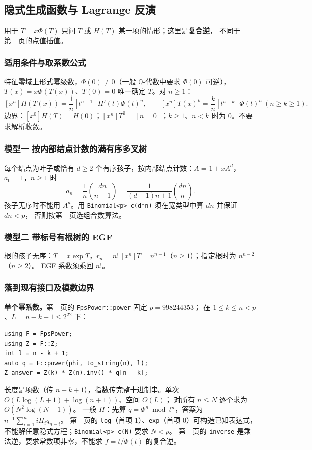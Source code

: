\subsection{隐式生成函数与 Lagrange 反演}\label{knowledge-lagrange-inversion}
用于 $T=x\Phi(T)$ 只问 $T$ 或 $H(T)$ 某一项的情形；这里是\textbf{复合逆}，
不同于第~\pageref{compact-Lagrange}~页的点值插值。

\subsubsection{适用条件与取系数公式}
特征零域上形式幂级数，$\Phi(0)\ne0$（一般 $\mathbb Q$-代数中要求 $\Phi(0)$ 可逆），
$T(x)=x\Phi(T(x))$、$T(0)=0$ 唯一确定 $T$。对 $n\ge1$：
\[
\boxed{[x^n]H(T(x))=\frac1n[t^{n-1}]H'(t)\Phi(t)^n,}\qquad
\boxed{[x^n]T(x)^k=\frac{k}{n}[t^{n-k}]\Phi(t)^n\ (n\ge k\ge1).}
\]
边界：$[x^0]H(T)=H(0)$；$[x^n]T^0=[n=0]$；$k\ge1$、$n<k$ 时为 0。不要求解析收敛。

\subsubsection{模型一 按内部结点计数的满有序多叉树}
每个结点为叶子或恰有 $d\ge2$ 个有序孩子，按内部结点计数：$A=1+xA^d$，$a_0=1$，$n\ge1$ 时
\[
a_n=\frac1n\binom{dn}{n-1}=\frac1{(d-1)n+1}\binom{dn}{n}.
\]
孩子无序时不能用 $A^d$。用 \texttt{Binomial<p> c(d*n)} 须在宽类型中算 $dn$ 并保证 $dn<p$，
否则按第~\pageref{knowledge-binomial-choice}~页选组合数算法。

\subsubsection{模型二 带标号有根树的 EGF}
根的孩子无序：$T=x\exp T$，$r_n=n!\,[x^n]T=n^{n-1}$（$n\ge1$）；指定根时为 $n^{n-2}$（$n\ge2$）。
EGF 系数须乘回 $n!$。

\subsubsection{落到现有接口及模数边界}
\textbf{单个幂系数。}第~\pageref{compact-FpsPower}~页的 \texttt{FpsPower::power} 固定 $p=998244353$；
在 $1\le k\le n<p$、$L=n-k+1\le2^{22}$ 下：
\begin{lstlisting}
using F = FpsPower;
using Z = F::Z;
int l = n - k + 1;
auto q = F::power(phi, to_string(n), l);
Z answer = Z(k) * Z(n).inv() * q[n - k];
\end{lstlisting}
长度是项数（传 $n-k+1$），指数传完整十进制串。单次 $O(L\log(L+1)+\log(n+1))$、空间 $O(L)$；
对所有 $n\le N$ 逐个求为 $O(N^2\log(N+1))$。
一般 $H$：先算 $q=\Phi^n\bmod t^n$，答案为 $n^{-1}\sum_{i=1}^n iH_iq_{n-i}$。
第~\pageref{compact-FpsFunctions}~页的 \texttt{log}（首项 1）、\texttt{exp}（首项 0）可构造已知表达式，
不能解任意隐式方程；\texttt{Binomial<p> c(N)} 要求 $N<p$。
第~\pageref{compact-FpsInverse}~页的 \texttt{inverse} 是乘法逆，要求常数项非零，不能求 $f=t/\Phi(t)$ 的复合逆。


